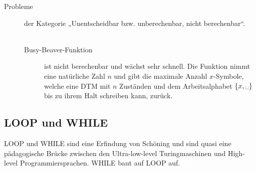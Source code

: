 \documentclass[a4paper,10pt]{article}
\newcommand{\vl}[1]{\colorbox{vl}{\textcolor{white}{\small\textbf{#1}}}}
\newcommand{\blank}{\text{\textvisiblespace}}
\begin{document}
\begin{description}
        \item[Probleme] der Kategorie „Unentscheidbar bzw. unberechenbar, nicht berechenbar“. \vl{TIL 2}
            \begin{description}
                \item[Busy-Beaver-Funktion] ist nicht berechenbar und wächst sehr schnell. Die Funktion nimmt eine natürliche Zahl $n$ und gibt die maximale Anzahl $x$-Symbole, welche eine DTM mit $n$ Zuständen und dem Arbeitsalphabet $\{x,\blank\}$ bis zu ihrem Halt schreiben kann, zurück.
            \end{description}
    \end{description}


    \subsection{LOOP und WHILE}
    LOOP und WHILE sind eine Erfindung von Schöning und sind quasi eine pädagogische Brücke zwischen den Ultra-low-level Turingmaschinen und High-level Programmiersprachen. WHILE baut auf LOOP auf. \vl{TIL 3}
\end{document}
